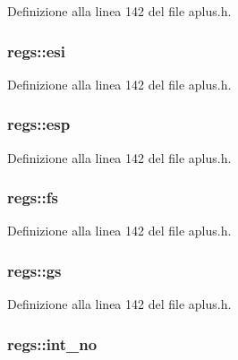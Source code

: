 Definizione alla linea 142 del file aplus.\+h.

\hypertarget{structregs_a88723011f6b017490ee8bc7fc9a3235c}{
\subsubsection[{esi}]{ regs\+::esi}}\label{structregs_a88723011f6b017490ee8bc7fc9a3235c}


Definizione alla linea 142 del file aplus.\+h.

\hypertarget{structregs_a7c44c0dc13f854e06e6cc509ba6e9054}{
\subsubsection[{esp}]{ regs\+::esp}}\label{structregs_a7c44c0dc13f854e06e6cc509ba6e9054}


Definizione alla linea 142 del file aplus.\+h.

\hypertarget{structregs_a0974815767aa327833ce6beac16858d5}{
\subsubsection[{fs}]{ regs\+::fs}}\label{structregs_a0974815767aa327833ce6beac16858d5}


Definizione alla linea 142 del file aplus.\+h.

\hypertarget{structregs_a0fd3992a1d7ba82600e1e03bf5466ce8}{
\subsubsection[{gs}]{ regs\+::gs}}\label{structregs_a0fd3992a1d7ba82600e1e03bf5466ce8}


Definizione alla linea 142 del file aplus.\+h.

\hypertarget{structregs_ae15fe95c86d4f1c84d475f3d709286b5}{
\subsubsection[{int\+\_\+no}]{ regs\+::int\+\_\+no}}\label{structregs_ae15fe95c86d4f1c84d475f3d709286b5}


